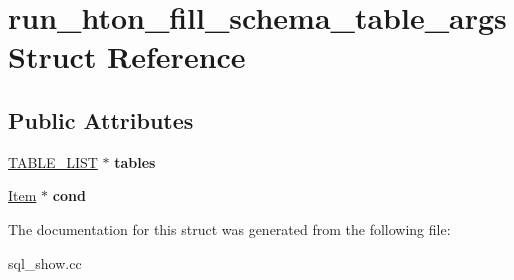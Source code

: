 \hypertarget{structrun__hton__fill__schema__table__args}{}\section{run\+\_\+hton\+\_\+fill\+\_\+schema\+\_\+table\+\_\+args Struct Reference}
\label{structrun__hton__fill__schema__table__args}
\subsection*{Public Attributes}
\begin{DoxyCompactItemize}
\item 
\mbox{\label{structrun__hton__fill__schema__table__args_a3c20dd39fe1746a6f4aafd275b879e3f}} 
\mbox{\hyperlink{structTABLE__LIST}{T\+A\+B\+L\+E\+\_\+\+L\+I\+ST}} $\ast$ {\bfseries tables}
\item 
\mbox{\label{structrun__hton__fill__schema__table__args_aa5a421391422c6af8a5765a3451b377d}} 
\mbox{\hyperlink{classItem}{Item}} $\ast$ {\bfseries cond}
\end{DoxyCompactItemize}


The documentation for this struct was generated from the following file\+:\begin{DoxyCompactItemize}
\item 
sql\+\_\+show.\+cc\end{DoxyCompactItemize}
